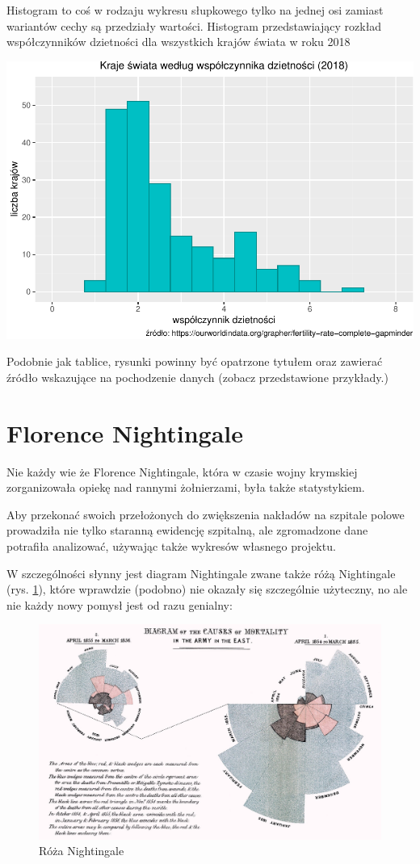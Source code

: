 \documentclass[
  openany]{book}
\begin{document}
Histogram to coś w rodzaju wykresu słupkowego tylko na jednej osi zamiast
wariantów cechy są przedziały wartości.
Histogram przedstawiający rozkład współczynników dzietności dla
wszystkich krajów świata w roku 2018

\includegraphics{_main_files/figure-latex/unnamed-chunk-10-1.pdf}

Podobnie jak tablice, rysunki powinny być opatrzone tytułem
oraz zawierać źródło wskazujące na pochodzenie danych
(zobacz przedstawione przykłady.)

\hypertarget{florence-nightingale}{%
\section{Florence Nightingale}\label{florence-nightingale}}

Nie każdy wie że Florence Nightingale, która
w czasie wojny krymskiej zorganizowała opiekę nad rannymi żołnierzami,
była także statystykiem.

Aby przekonać swoich przełożonych do zwiększenia nakładów na szpitale polowe prowadziła
nie tylko staranną ewidencję szpitalną, ale zgromadzone dane potrafiła analizować, używając
także wykresów własnego projektu.

W szczególności słynny jest diagram Nightingale zwane także
różą Nightingale (rys. \ref{fig:nightingale}), które wprawdzie
(podobno) nie okazały się szczególnie użyteczny, no ale nie każdy nowy
pomysł jest od razu genialny:

\begin{figure}
\includegraphics[width=0.9\linewidth]{./FN_diagram} \caption{Róża Nightingale}\label{fig:nightingale}
\end{figure}
\end{document}
